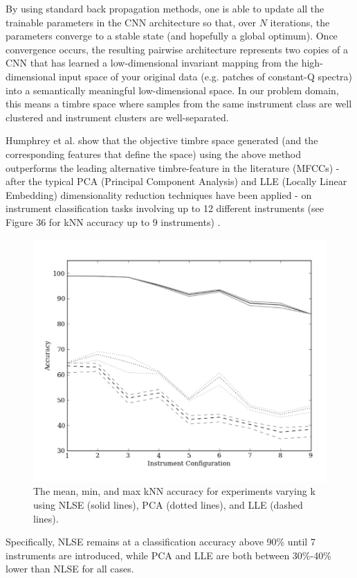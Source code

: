 \documentclass[12pt]{report} 	%
\numberwithin{figure}{chapter}
\numberwithin{table}{chapter}
\numberwithin{equation}{chapter}
\begin{document}
\begin{flushleft}
By using standard back propagation methods, one is able to update all the trainable parameters in the CNN architecture so that, over $N$ iterations, the parameters converge to a stable state (and hopefully a global optimum). Once convergence occurs, the resulting pairwise architecture represents two copies of a CNN that has learned a low-dimensional invariant mapping from the high-dimensional input space of your original data (e.g. patches of constant-Q spectra) into a semantically meaningful low-dimensional space. In our problem domain, this means a timbre space where samples from the same instrument class are well clustered and instrument clusters are well-separated.

Humphrey et al. show that the objective timbre space generated (and the corresponding features that define the space) using the above method outperforms the leading alternative timbre-feature in the literature (MFCCs) - after the typical PCA (Principal Component Analysis) and LLE (Locally Linear Embedding) dimensionality reduction techniques have been applied - on instrument classification tasks involving up to 12 different instruments (see Figure 36 for kNN accuracy up to 9 instruments) \cite{Humphrey:2000th}. \begin{figure}[h!]
\begin{center}
\includegraphics[scale=0.85]{CNN_kNN}
\caption[kNN accuracy for NLSE, PCA, and LLE]{The mean, min, and max kNN accuracy for experiments varying k using NLSE (solid lines), PCA (dotted lines), and LLE (dashed lines).}
\end{center}
\end{figure}
Specifically, NLSE remains at a classification accuracy above 90\% until 7 instruments are introduced, while PCA and LLE are both between 30\%-40\% lower than NLSE for all cases.


\end{flushleft}
\end{document}
